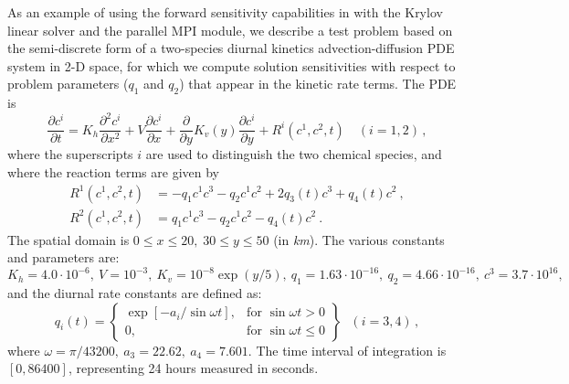 As an example of using the forward sensitivity capabilities in {\cvodes} 
with the Krylov linear solver {\cvspgmr} and the parallel MPI {\nvecp} module, 
we describe a test problem based on the
semi-discrete form of a two-species diurnal kinetics advection-diffusion PDE 
system in 2-D space, for which we compute solution sensitivities with respect to 
problem parameters ($q_1$ and $q_2$) that appear in the kinetic rate terms.
The PDE is
\begin{equation}\label{e:pvfkx_PDE}
  \frac{\partial c^i}{\partial t} = K_h\frac{\partial^2 c^i}{\partial x^2}
  +V \frac{\partial c^i}{\partial x}
  + \frac{\partial} {\partial y} K_v(y) \frac{\partial c^i}{\partial y}
  + R^i(c^1,c^2,t) \quad (i=1,2) \, ,
\end{equation}
where the superscripts $i$ are used to distinguish the two chemical
species, and where the reaction terms are given by
\begin{equation}\label{e:pvfkx_R}
  \begin{split}
    R^1(c^1,c^2,t) & = -q_1c^1c^3-q_2c^1c^2+2q_3(t)c^3+q_4(t)c^2 ~, \\
    R^2(c^1,c^2,t) & = q_1c^1c^3-q_2c^1c^2-q_4(t)c^2 ~.
  \end{split}
\end{equation}
The spatial domain is $0 \leq x \leq 20,\;30 \leq y \leq 50$ (in {\em km}). 
The various constants and parameters are: $K_h=4.0\cdot 10^{-6},
~ V=10^{-3},~ K_v=10^{-8}\exp (y/5),~ q_1=1.63\cdot 10^{-16},
~ q_2=4.66\cdot 10^{-16},~ c^3=3.7\cdot 10^{16},$ and the diurnal
rate constants are defined as:
\begin{equation*}
  q_i(t) = 
  \left\{ \begin{array}{ll}
      \exp [-a_i/\sin \omega t], & \mbox{for } \sin \omega t>0 \\
      0, & \mbox{for } \sin \omega t\leq 0
    \end{array} \right\} ~~~(i=3,4) \, ,
\end{equation*}
where $\omega =\pi /43200, ~ a_3=22.62,~ a_4=7.601.$  The time interval of
integration is $[0, 86400]$, representing 24 hours measured in seconds.


